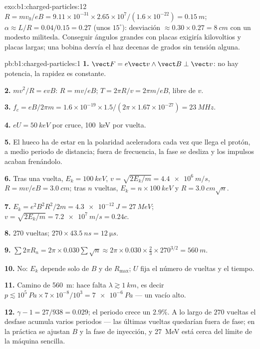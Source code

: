 \begin{solution}{exo:b1:charged-particles:12}
$R = mv_0/eB = 9.11\times10^{-31} \times 2.65\times10^7/(1.6\times10^{-22}) =
\qty{0.15}{m}$; $\alpha \approx L/R = 0.04/0.15 = 0.27$ (unos $15^\circ$):
desviación $\approx 0.30 \times 0.27 = \qty{8}{cm}$ con un modesto
militesla. Conseguir ángulos grandes con placas exigiría kilovoltios y
placas largas; una bobina desvía el haz decenas de grados sin tensión alguna.
\end{solution}

\begin{solution}{pb:b1:charged-particles:1}
\textbf{1.} $\vect F = e\vect v\wedge\vect B \perp \vect v$: no hay potencia,
la rapidez es constante.

\textbf{2.} $mv^2/R = evB$: $R = mv/eB$; $T = 2\pi R/v = 2\pi m/eB$, libre de
$v$.

\textbf{3.} $f_c = eB/2\pi m = 1.6\times10^{-19} \times 1.5/(2\pi \times 1.67
\times10^{-27}) = \qty{23}{MHz}$.

\textbf{4.} $eU = \qty{50}{keV}$ por cruce, \qty{100}{keV} por vuelta.

\textbf{5.} El hueco ha de estar en la polaridad aceleradora cada vez que
llega el protón, a medio periodo de distancia; fuera de frecuencia, la
fase se desliza y los impulsos acaban frenándolo.

\textbf{6.} Tras una vuelta, $E_k = \qty{100}{keV}$, $v = \sqrt{2E_k/m} =
\qty{4.4e6}{m/s}$, $R = mv/eB = \qty{3.0}{cm}$; tras $n$ vueltas, $E_k =
n \times \qty{100}{keV}$ y $R = \qty{3.0}{cm}\sqrt n$.

\textbf{7.} $E_k = e^2B^2R^2/2m = \qty{4.3e-12}{J} = \qty{27}{MeV}$; $v =
\sqrt{2E_k/m} = \qty{7.2e7}{m/s} = 0.24c$.

\textbf{8.} $270$ vueltas; $270 \times \qty{43.5}{ns} = \qty{12}{\micro s}$.

\textbf{9.} $\sum 2\pi R_n = 2\pi \times 0.030\sum\sqrt n \approx 2\pi \times 0.030
\times \tfrac23 \times 270^{3/2} = \qty{560}{m}$.

\textbf{10.} No: $E_k$ depende solo de $B$ y de $R_{\max}$; $U$ fija el
número de vueltas y el tiempo.

\textbf{11.} Camino de \qty{560}{m}: hace falta $\lambda \gtrsim \qty{1}{km}$, es decir
$p \lesssim 10^5\ \unit{Pa} \times 7\times10^{-8}/10^3 = \qty{7e-6}{Pa}$ ---
un vacío alto.

\textbf{12.} $\gamma - 1 = 27/938 = 0.029$; el periodo crece un $2.9\%$. A
lo largo de $270$ vueltas el desfase acumula varios periodos --- las
últimas vueltas quedarían fuera de fase; en la práctica se ajustan $B$ y
la fase de inyección, y \qty{27}{MeV} está cerca del límite de la máquina sencilla.


\end{solution}
